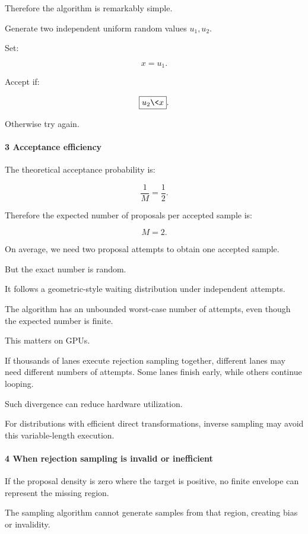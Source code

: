 Therefore the algorithm is remarkably simple.

Generate two independent uniform random values \(u_1,u_2\).

Set:

\[
 x=u_1.
\]

Accept if:

\[
 \boxed{u_2\<x}.
\]

Otherwise try again.

\paragraph{3 Acceptance efficiency}\label{acceptance-efficiency}

The theoretical acceptance probability is:

\[
 \frac1M=\frac12.
\]

Therefore the expected number of proposals per accepted sample is:

\[
 \boxed{M=2}.
\]

On average, we need two proposal attempts to obtain one accepted sample.

But the exact number is random.

It follows a geometric-style waiting distribution under independent attempts.

The algorithm has an unbounded worst-case number of attempts, even though the expected number is finite.

This matters on GPUs.

If thousands of lanes execute rejection sampling together, different lanes may need different numbers of attempts. Some lanes finish early, while others continue looping.

Such divergence can reduce hardware utilization.

For distributions with efficient direct transformations, inverse sampling may avoid this variable-length execution.

\paragraph{4 When rejection sampling is invalid or inefficient}\label{when-rejection-sampling-is-invalid-or-inefficient}

If the proposal density is zero where the target is positive, no finite envelope can represent the missing region.

The sampling algorithm cannot generate samples from that region, creating bias or invalidity.


